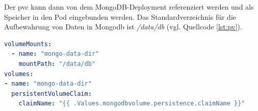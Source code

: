Der \acs{pvc} kann dann von dem MongoDB-Deployment referenziert werden 
und als Speicher in den Pod eingebunden werden. 
Das Standardverzeichnis für die Aufbewahrung von Daten in Mongodb ist \textit{/data/db} \cite{mongodbpath} (vgl. Quellcode \ref{lst:pv}).

\begin{lstlisting}[caption={Ausschnitt aus dem mongodb-deployment.yaml },captionpos=b,label={lst:pv},language=yaml]
  volumeMounts:
  - name: "mongo-data-dir"
    mountPath: "/data/db"
volumes:
- name: "mongo-data-dir"
  persistentVolumeClaim:
    claimName: "{{ .Values.mongodbvolume.persistence.claimName }}"
\end{lstlisting}
